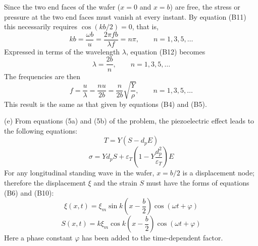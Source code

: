 Since the two end faces of the wafer ($x=0$ and $x=b$) are free, the stress or pressure at the two end faces must vanish at every instant. By equation (B11) this necessarily requires $\cos(kb/2)=0$, that is,
\begin{equation}
kb=\frac{\omega b}{u}=\frac{2\pi f b}{\lambda f}=n\pi,\qquad n=1,3,5,\dots \tag{B12}
\end{equation}
Expressed in terms of the wavelength $\lambda$, equation (B12) becomes
\begin{equation}
\lambda=\frac{2b}{n},\qquad n=1,3,5,\dots \tag{B13}
\end{equation}
The frequencies are then
\begin{equation}
f=\frac{u}{\lambda}=\frac{nu}{2b}=\frac{n}{2b}\sqrt{\frac{Y}{\rho}},\qquad n=1,3,5,\dots \tag{B14}
\end{equation}
This result is the same as that given by equations (B4) and (B5).

(e) From equations (5a) and (5b) of the problem, the piezoelectric effect leads to the following equations:
\begin{equation}
T=Y(S-d_pE) \tag{B15}
\end{equation}
\begin{equation}
\sigma=Yd_pS+\varepsilon_T\left(1-Y\frac{d_p^2}{\varepsilon_T}\right)E \tag{B16}
\end{equation}
For any longitudinal standing wave in the wafer, $x=b/2$ is a displacement node; therefore the displacement $\xi$ and the strain $S$ must have the forms of equations (B6) and (B10):
\begin{equation}
\xi(x,t)=\xi_m\sin k\left(x-\frac{b}{2}\right)\cos(\omega t+\varphi) \tag{B17}
\end{equation}
\begin{equation}
S(x,t)=k\xi_m\cos k\left(x-\frac{b}{2}\right)\cos(\omega t+\varphi) \tag{B18}
\end{equation}
Here a phase constant $\varphi$ has been added to the time-dependent factor.


